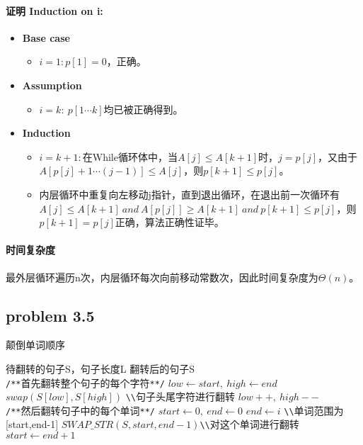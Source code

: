 \documentclass[11pt]{ctexart}
\begin{document}
	\paragraph{证明 Induction on i:}\label{Induction_previous}
	\begin{itemize}
		\item \textbf{Base case}
		\begin{itemize}
			\item {$i=1:p[1]=0$，正确。}
		\end{itemize}
		\item \textbf{Assumption}
		\begin{itemize}
			\item {$i=k:\ p[1\cdots k]$均已被正确得到。}
		\end{itemize}
		\item \textbf{Induction}
		\begin{itemize}
			\item {$i=k+1:$在While循环体中，当$A[j]\leq A[k+1]$时，$j = p[j]$，又由于$A[p[j]+1\cdots (j-1)]\leq A[j]$，则$p[k+1] \leq p[j]$。}
			\item[]{内层循环中重复向左移动j指针，直到退出循环，在退出前一次循环有$A[j]\leq A[k+1]\ and\ A[p[j]]\geq A[k+1] \ and \ p[k+1] \leq p[j]$，则$p[k+1]=p[j]$正确，算法正确性证毕。}
		\end{itemize}
	\end{itemize}
	\paragraph{时间复杂度}
	最外层循环遍历n次，内层循环每次向前移动常数次，因此时间复杂度为$\Theta(n)$。
	\newpage
	\subsection*{problem 3.5}
	\begin{algorithm}
		\caption{颠倒单词顺序}
		\label{reverse}
		\begin{algorithmic}[1]
			\Require 待翻转的句子S，句子长度L
			\Ensure 翻转后的句子S
			\\
			\verb|/**|首先翻转整个句子的每个字符\verb|**/|
			\State $low \gets start,\ high \gets end$
			\State $swap(S[low],S[high])$ \verb|\\|句子头尾字符进行翻转
			\State $low++,\ high--$
			\EndWhile
			\EndFunction
			\\
			\verb|/**|然后翻转句子中的每个单词\verb|**/|
			\State $start \gets 0,\ end \gets 0$
			\State $end\gets i$
			\verb|\\|单词范围为[start,end-1]
			\State $SWAP\_STR(S,start,end-1)$\verb|\\|对这个单词进行翻转
			\State $start \gets end+1$ 
			\EndIf
			\EndFor
			\State {}
			\EndFunction
		\end{algorithmic}
	\end{algorithm}
	
\end{document}

